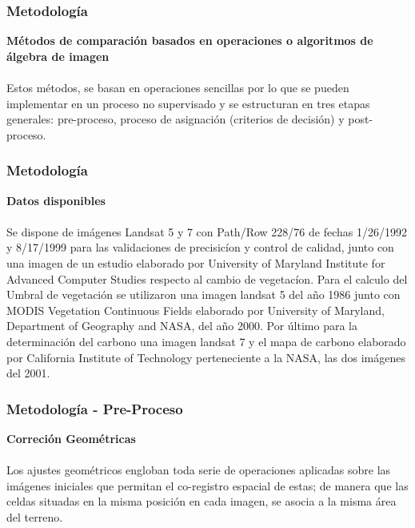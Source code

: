 \documentclass[xcolor=table]{beamer}
\begin{document}
\begin{frame}\frametitle{Metodolog\'ia }
\textbf{M\'etodos de comparaci\'on basados en operaciones o algoritmos de \'algebra de imagen}\\~\\	
Estos m\'etodos, se basan en operaciones sencillas por lo que se pueden implementar en un proceso no supervisado y se estructuran en tres etapas generales: pre-proceso, proceso de asignación (criterios de decisión) y post-proceso.	
	
\end{frame}
\begin{frame}\frametitle{Metodolog\'ia }
	\textbf{Datos disponibles}\\~\\	
	Se dispone de im\'agenes Landsat 5 y 7 con Path/Row 228/76 de fechas 1/26/1992 y 8/17/1999 para las validaciones de precisic\'ion y control de calidad, junto con una imagen de un estudio elaborado por University of Maryland Institute for Advanced Computer Studies respecto al cambio de vegetac\'ion.
	Para el calculo del Umbral de vegetaci\'on se utilizaron una imagen landsat 5 del a\~{n}o 1986 junto con MODIS Vegetation Continuous Fields elaborado por University of Maryland, Department of Geography and NASA, del a\~{n}o 2000.
	Por \'ultimo para la determinaci\'on del carbono una imagen landsat 7 y el mapa de carbono elaborado por California Institute of Technology perteneciente a la NASA, las dos im\'agenes del 2001.
	
\end{frame}

\begin{frame}\frametitle{Metodolog\'ia - Pre-Proceso}
	\textbf{Correci\'on Geom\'etricas}\\~\\	
Los ajustes geom\'etricos engloban toda serie de operaciones aplicadas sobre las	im\'agenes iniciales que permitan el co-registro espacial de estas; de manera que las celdas situadas en la misma posici\'on en cada imagen, se asocia a la misma área del terreno.
	
	
\end{frame}
\end{document}

